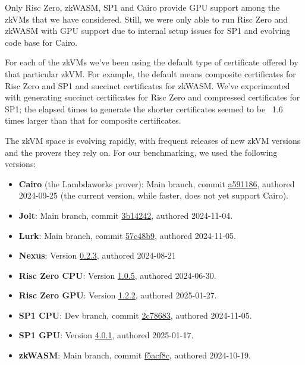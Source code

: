 \documentclass{article}
\theoremstyle{plain}
\theoremstyle{definition}
\begin{document}
Only Risc Zero, zkWASM, SP1 and Cairo provide GPU support among the zkVMs that we have considered. Still, we were only able to run Risc Zero and zkWASM with GPU support due to internal setup issues for SP1 and evolving code base for Cairo.

For each of the zkVMs we've been using the default type of certificate offered by that particular zkVM. For example, the default means composite certificates for Risc Zero and SP1 and succinct certificates for zkWASM. We've experimented with generating succinct certificates for Risc Zero and compressed certificates for SP1; the elapsed times to generate the shorter certificates seemed to be ~1.6 times larger than that for composite certificates.

The zkVM space is evolving rapidly, with frequent releases of new zkVM versions and the provers they rely on. For our benchmarking, we used the following versions: 
\begin{itemize}
\item \textbf{Cairo} (the Lambdaworks prover): Main branch, commit \href{https://github.com/lambdaclass/lambdaworks/commit/a591186e6c4dd53301b03b4ddd69369abe99f960}{a591186}, authored 2024-09-25 (the current version, while faster, does not yet support Cairo).
\item \textbf{Jolt}: Main branch, commit \href{https://github.com/a16z/jolt/commit/3b142426d9648299d9c6912e7e1b4698cf91491b}{3b14242}, authored 2024-11-04.
\item \textbf{Lurk}: Main branch, commit \href{https://github.com/lurk-lab/lurk/commit/57c48b987a94ba1f9752408a0990882c9f4f506b}{57c48b9}, authored 2024-11-05.
\item \textbf{Nexus}: Version \href{https://github.com/nexus-xyz/nexus-zkVM/releases/tag/v0.2.3}{0.2.3}, authored 2024-08-21
\item \textbf{Risc Zero CPU}: Version \href{https://github.com/risc0/risc0/releases/tag/v1.0.5}{1.0.5}, authored 2024-06-30.
\item \textbf{Risc Zero GPU}: Version \href{https://github.com/risc0/risc0/releases/tag/v1.0.5}{1.2.2}, authored 2025-01-27.
\item \textbf{SP1 CPU}: Dev branch, commit \href{https://github.com/succinctlabs/sp1/commit/2c7868364cb832531e8cafd258aa06fbab079459}{2c78683}, authored 2024-11-05.
\item \textbf{SP1 GPU}: Version \href{https://github.com/succinctlabs/sp1/releases/tag/v4.0.1}{4.0.1}, authored 2025-01-17.
\item \textbf{zkWASM}: Main branch, commit \href{https://github.com/DelphinusLab/zkWasm/commit/f5acf8c58c32ac8c6426298be69958a6bea2b89a}{f5acf8c}, authored 2024-10-19.
\end{itemize}
\end{document}
